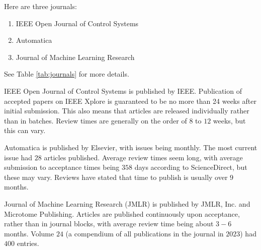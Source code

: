 \documentclass[10pt, oneside]{article}
\newenvironment{problem}[2][Problem]{\begin{trivlist}
    \item[\hskip \labelsep {\bfseries #1}\hskip \labelsep {\bfseries #2.}]}{\end{trivlist}}
\begin{document}
    
\begin{problem}{$\#3$}
Here are three journals:
\begin{enumerate}
    \item IEEE Open Journal of Control Systems
    \item Automatica
    \item Journal of Machine Learning Research
\end{enumerate} 

See Table \ref{tab:journals} for more details.

\begin{table}[h!]
    \centering
    \caption{Journal information summary, with all details given. }
    \label{tab:journals}
    \end{table}

IEEE Open Journal of Control Systems is published by IEEE.  Publication of accepted papers on IEEE Xplore is guaranteed to be no more than 24 weeks after initial submission. This also means that articles are released individually rather than in batches.  Review times are generally on the order of $8$ to $12$ weeks, but this can vary. 

Automatica is published by Elsevier, with issues being monthly. The most current issue had $28$ articles published. Average review times seem long, with average submission to acceptance times being $358$ days according to ScienceDirect, but these may vary. Reviews have stated that time to publish is usually over $9$ months. 

Journal of Machine Learning Research (JMLR) is published by JMLR, Inc. and Microtome Publishing. Articles are published continuously upon acceptance, rather than in journal blocks, with average review time being about $3-6$ months. Volume $24$ (a compendium of all publications in the journal in $2023$) had $400$ entries. 
\end{problem}
\end{document}
